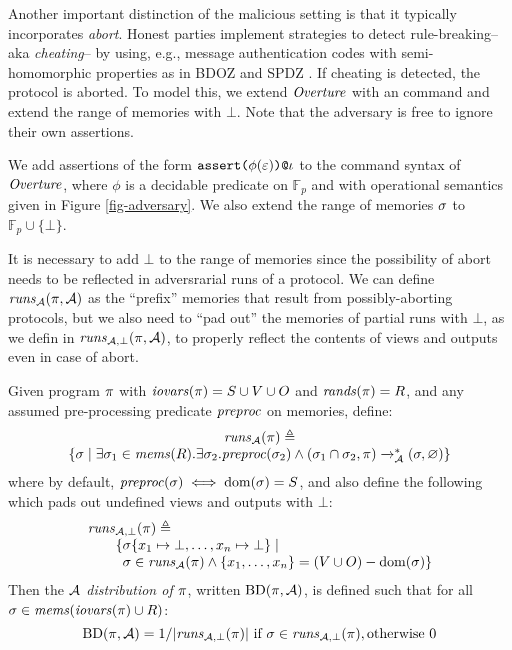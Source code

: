 Another important distinction of the malicious setting is that it
typically incorporates \emph{abort}. Honest parties implement
strategies to detect rule-breaking-- aka \emph{cheating}-- by
using, e.g., message authentication codes with semi-homomorphic
properties as in BDOZ and SPDZ \cite{XXX}. If cheating is
detected, the protocol is aborted. To model this, we extend
$\mathit{Overture}$ with an  command and extend the
range of memories with $\bot$. Note that the adversary is
free to ignore their own assertions.
\begin{definition}
  We add assertions of the form $\texttt{assert(}\phi(\varepsilon)\texttt{)}\texttt{@}\iota$ to the command
  syntax of $\mathit{Overture}$, where $\phi$ is a decidable predicate on
  $\mathbb{F}_p$ and with operational semantics given in Figure
  \ref{fig-adversary}. We also extend the range of memories $\sigma$
  to $\mathbb{F}_p \cup \{ \bot \}$.
\end{definition}

It is necessary to add $\bot$ to the range of memories since
the possibility of abort needs to be reflected in adversrarial
runs of a protocol. We can define $\mathit{runs}_{\mathcal{A}}(\pi,\mathcal{A})$
as the ``prefix'' memories that result from possibly-aborting
protocols, but we also need to ``pad out'' the memories
of partial runs with $\bot$, as we defin in $\mathit{runs}_{\mathcal{A},\bot}(\pi,\mathcal{A})$,
to properly reflect the contents of views and outputs even in case of abort. 
\begin{definition}
  \label{def-progd}
  \label{definition-progd}
  Given program $\pi$ with $\mathit{iovars}(\pi) = S \cup V \cup O$ and $\mathit{rands}(\pi) = R$, and
  any assumed pre-processing predicate $\mathit{preproc}$ on memories, define:
  $$
  \begin{array}{c}
    \mathit{runs}_{\mathcal{A}}(\pi) \triangleq \\
    \{ \sigma \mid \exists \sigma_1 \in \mathit{mems}(R) . 
    \exists \sigma_2 . \mathit{preproc}(\sigma_2) \wedge
    (\sigma_1 \cap \sigma_2,\pi) \xrightarrow{}^{*}_{\mathcal{A}} (\sigma,\varnothing) \}
  \end{array}
  $$
  where by default, $\mathit{preproc}(\sigma) \iff \mathrm{dom}(\sigma) = S$, and also define the following
  which pads out undefined views and outputs with $\bot$:
  $$
  \begin{array}{l}
    \botruns(\prog) \defeq \\
    \qquad \{ \store\{ x_1 \mapsto \bot, \ldots, x_n \mapsto \bot \} \mid \\
    \qquad \phantom{\{} \store \in \aruns(\prog) \wedge \{ x_1,\ldots,x_n\} = (V \cup O) - \dom(\store) \}
  \end{array}
  $$
  Then the \emph{$\mathcal{A}$ distribution of $\pi$}, written $\mathrm{BD}(\pi,\mathcal{A})$, is
  defined such that for all $\sigma \in \mathit{mems}(\mathit{iovars}(\pi) \cup R)$:
  $$
  \mathrm{BD}(\pi,\mathcal{A}) =  1 / |\mathit{runs}_{\mathcal{A},\bot}(\pi)| \ \text{if}\ \sigma \in \mathit{runs}_{\mathcal{A},\bot}(\pi), \text{otherwise}\ 0
  $$
\end{definition}

